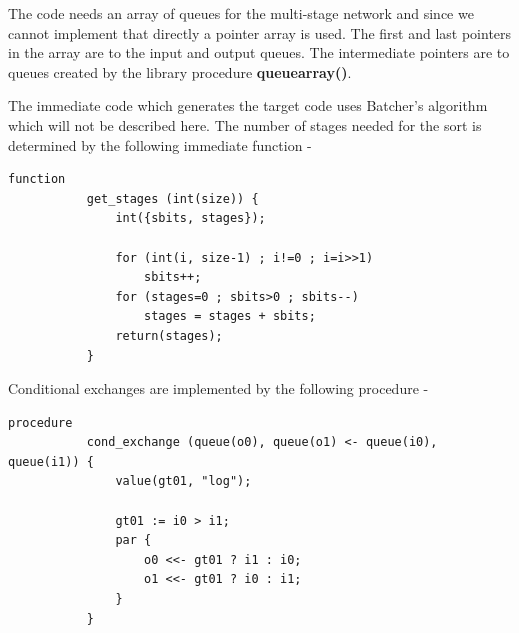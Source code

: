         The code needs an array of queues for the multi-stage network and since
        we cannot implement that directly a pointer array is used. The first
        and last pointers in the array are to the input and output queues. The
        intermediate pointers are to queues created by the library procedure
        {\bf queuearray()}.
        
        The immediate code which generates the target code uses
        Batcher's algorithm which will not be described here. The number of
        stages needed for the sort is determined by the following immediate
        function -
        \begin{lstlisting}[gobble=8, language=threepl]
           function
           get_stages (int(size)) {
               int({sbits, stages});

               for (int(i, size-1) ; i!=0 ; i=i>>1)
                   sbits++;
               for (stages=0 ; sbits>0 ; sbits--)
                   stages = stages + sbits;
               return(stages);
           }
        \end{lstlisting}
        Conditional exchanges are implemented by the following procedure -
        \begin{lstlisting}[gobble=8, language=threepl]
           procedure
           cond_exchange (queue(o0), queue(o1) <- queue(i0),  queue(i1)) {
               value(gt01, "log");

               gt01 := i0 > i1;
               par {
                   o0 <<- gt01 ? i1 : i0;
                   o1 <<- gt01 ? i0 : i1;
               }
           }
        \end{lstlisting}
